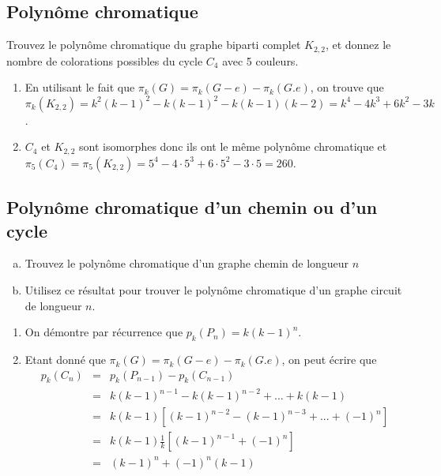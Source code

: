 \subsection{Polynôme chromatique}
Trouvez le polynôme chromatique du graphe biparti complet $K_{2,2}$, et donnez le nombre de colorations possibles du cycle $C_4$ avec 5 couleurs.

\begin{solution}
  \begin{enumerate}
  \item En utilisant le fait que $\pi_k(G) = \pi_k(G-e) - \pi_k(G.e)$, on trouve que $\pi_k(K_{2,2}) = k^2(k-1)^2 - k (k-1)^2 - k(k-1)(k-2) = k^4-4k^3+6k^2-3k$.
  \item $C_4$ et $K_{2,2}$ sont isomorphes donc ils ont le même polynôme chromatique et $\pi_5(C_4) = \pi_5(K_{2,2}) = 5^4 - 4\cdot 5^3 + 6\cdot 5^2 - 3\cdot 5 = 260$.
\end{enumerate}
\end{solution}

\subsection{Polynôme chromatique d'un chemin ou d'un cycle}
\begin{enumerate}[(a)]
  \item Trouvez le polynôme chromatique d'un graphe chemin de longueur $n$
  \item Utilisez ce résultat pour trouver le polynôme chromatique d'un graphe circuit de longueur $n$.
\end{enumerate}

\begin{solution}
  \begin{enumerate}
  \item On démontre par récurrence que $p_k(P_n) = k(k-1)^n$.
  \item Etant donné que $\pi_k(G) = \pi_k(G-e) - \pi_k(G.e)$, on peut écrire que
           \begin{eqnarray*}
           p_k(C_n) &=& p_k(P_{n-1}) - p_k(C_{n-1})\\
           		    &=& k(k-1)^{n-1} - k(k-1)^{n-2} + ... + k(k-1)\\
		             &=& k(k-1) [(k-1)^{n-2} - (k-1)^{n-3} + ... + (-1)^n]\\
		             &=& k(k-1)\frac{1}{k}[(k-1)^{n-1}+(-1)^n]\\
		             &=& (k-1)^n + (-1)^n (k-1)
	   \end{eqnarray*}             
\end{enumerate}
\end{solution}

